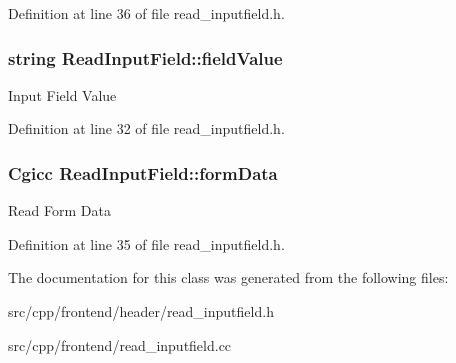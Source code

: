 Definition at line 36 of file read\-\_\-inputfield.\-h.

\hypertarget{classReadInputField_a0d95496b5fc8fb4badd4af19492182ae}{
\subsubsection[{field\-Value}]{\setlength{\rightskip}{0pt plus 5cm}string Read\-Input\-Field\-::field\-Value\hspace{0.3cm}{\ttfamily [protected]}}}\label{classReadInputField_a0d95496b5fc8fb4badd4af19492182ae}
Input Field Value 

Definition at line 32 of file read\-\_\-inputfield.\-h.

\hypertarget{classReadInputField_a1e4ebac8979fd9b2771320d669fce5fc}{
\subsubsection[{form\-Data}]{\setlength{\rightskip}{0pt plus 5cm}Cgicc Read\-Input\-Field\-::form\-Data\hspace{0.3cm}{\ttfamily [protected]}}}\label{classReadInputField_a1e4ebac8979fd9b2771320d669fce5fc}
Read Form Data 

Definition at line 35 of file read\-\_\-inputfield.\-h.



The documentation for this class was generated from the following files\-:\begin{DoxyCompactItemize}
\item 
src/cpp/frontend/header/read\-\_\-inputfield.\-h\item 
src/cpp/frontend/read\-\_\-inputfield.\-cc\end{DoxyCompactItemize}
